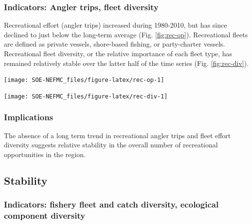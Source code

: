 \documentclass[
  10pt,
]{article}
\let\origfigure\figure
\let\endorigfigure\endfigure
\renewenvironment{figure}[1][2] {
    \expandafter\origfigure\expandafter[H]
} {
    \endorigfigure
}
\begin{document}
\hypertarget{indicators-angler-trips-fleet-diversity}{%
\subsubsection{Indicators: Angler trips, fleet diversity}\label{indicators-angler-trips-fleet-diversity}}

Recreational effort (angler trips) increased during 1980-2010, but has since declined to just below the long-term average (Fig. \ref{fig:rec-op}). Recreational fleets are defined as private vessels, shore-based fishing, or party-charter vessels. Recreational fleet diversity, or the relative importance of each fleet type, has remained relatively stable over the latter half of the time series (Fig. \ref{fig:rec-div}).

\begin{figure}

{\centering \texttt{[image: SOE-NEFMC\_files/figure-latex/rec-op-1]} 

}

\caption{Recreational effort in New England.}\label{fig:rec-op}
\end{figure}

\begin{figure}

{\centering \texttt{[image: SOE-NEFMC\_files/figure-latex/rec-div-1]} 

}

\caption{Recreational fleet effort diversity in New England.}\label{fig:rec-div}
\end{figure}

\hypertarget{implications-2}{%
\subsubsection{Implications}\label{implications-2}}

The absence of a long term trend in recreational angler trips and fleet effort diversity suggests relative stability in the overall number of recreational opportunities in the region.

\hypertarget{stability}{%
\subsection{Stability}\label{stability}}

\hypertarget{indicators-fishery-fleet-and-catch-diversity-ecological-component-diversity}{%
\subsubsection{Indicators: fishery fleet and catch diversity, ecological component diversity}\label{indicators-fishery-fleet-and-catch-diversity-ecological-component-diversity}}
\end{document}
